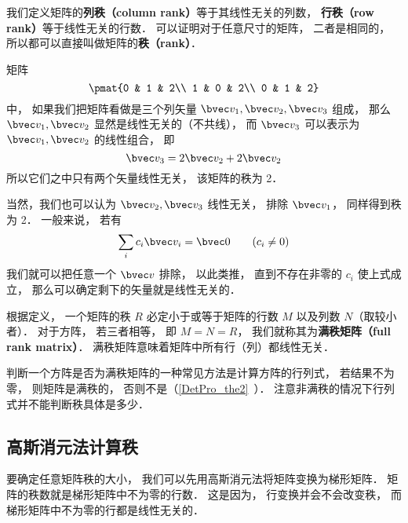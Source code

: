 

我们定义矩阵的\textbf{列秩（column rank）}等于其线性无关的列数， \textbf{行秩（row rank）}等于线性无关的行数． 可以证明对于任意尺寸的矩阵， 二者是相同的， 所以都可以直接叫做矩阵的\textbf{秩（rank）}．

\begin{example}{}
矩阵
\begin{equation}
\pmat{0 & 1 & 2\\ 1 & 0 & 2\\ 0 & 1 & 2}
\end{equation}
中， 如果我们把矩阵看做是三个列矢量 $\bvec v_1, \bvec v_2, \bvec v_3$ 组成， 那么 $\bvec v_1, \bvec v_2$ 显然是线性无关的（不共线）， 而 $\bvec v_3$ 可以表示为 $\bvec v_1, \bvec v_2$ 的线性组合， 即
\begin{equation}
\bvec v_3 = 2\bvec v_2 + 2\bvec v_2
\end{equation}
所以它们之中只有两个矢量线性无关， 该矩阵的秩为 2．

当然，我们也可以认为 $\bvec v_2, \bvec v_3$ 线性无关， 排除 $\bvec v_1$， 同样得到秩为 2． 一般来说， 若有
\begin{equation}
\sum_i c_i \bvec v_i = \bvec 0 \qquad (c_i \ne 0)
\end{equation}
我们就可以把任意一个 $\bvec v$ 排除， 以此类推， 直到不存在非零的 $c_i$ 使上式成立， 那么可以确定剩下的矢量就是线性无关的．
\end{example}

根据定义， 一个矩阵的秩 $R$ 必定小于或等于矩阵的行数 $M$ 以及列数 $N$（取较小者）． 对于方阵， 若三者相等， 即 $M = N = R$， 我们就称其为\textbf{满秩矩阵（full rank matrix）}． 满秩矩阵意味着矩阵中所有行（列）都线性无关．

判断一个方阵是否为满秩矩阵的一种常见方法是计算方阵的行列式， 若结果不为零， 则矩阵是满秩的， 否则不是（\autoref{DetPro_the2}~）． 注意非满秩的情况下行列式并不能判断秩具体是多少．


\subsection{高斯消元法计算秩}
要确定任意矩阵秩的大小， 我们可以先用高斯消元法将矩阵变换为梯形矩阵． 矩阵的秩数就是梯形矩阵中不为零的行数． 这是因为， 行变换并会不会改变秩， 而梯形矩阵中不为零的行都是线性无关的．
